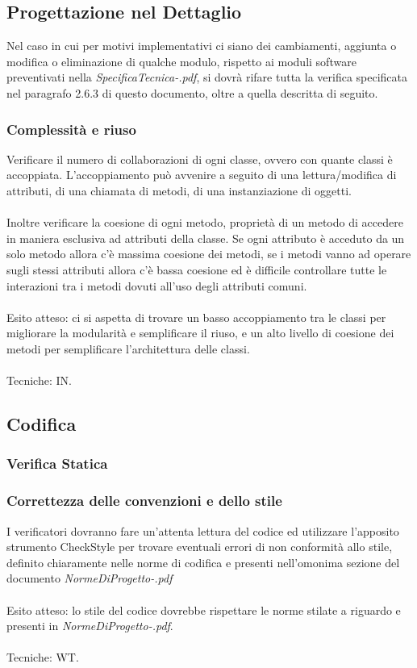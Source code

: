 \subsection{Progettazione nel Dettaglio}
Nel caso in cui per motivi implementativi ci siano dei
cambiamenti, aggiunta o modifica o eliminazione di qualche modulo, rispetto ai
moduli software preventivati nella \emph{SpecificaTecnica-\versioneST.pdf}, si
dovr\`a rifare tutta la verifica specificata nel paragrafo 2.6.3 di questo
documento, oltre a quella descritta di seguito. 
\subsubsection*{Complessit\`a e riuso}
Verificare il numero di collaborazioni di ogni classe, ovvero con quante classi
\`e accoppiata. L'accoppiamento pu\`o avvenire a seguito di una lettura/modifica
di attributi, di una chiamata di metodi, di una instanziazione di oggetti. \\ \\
Inoltre verificare la coesione di ogni metodo, propriet\`a di un metodo di
accedere in maniera esclusiva ad attributi della classe. Se ogni attributo \`e acceduto da
un solo metodo allora c'\`e massima coesione dei metodi, se i metodi vanno ad
operare sugli stessi attributi allora c'\`e bassa coesione ed \`e difficile
controllare tutte le interazioni tra i metodi dovuti all'uso degli attributi comuni.
\\ \\
Esito atteso: ci si aspetta di trovare un basso accoppiamento tra le classi per
migliorare la modularit\`a e semplificare il riuso, e un alto livello di
coesione dei metodi per semplificare l'architettura delle classi. \\ \\ 
Tecniche: IN.

\subsection{Codifica}

\subsubsection{Verifica Statica}

\subsubsection*{Correttezza delle convenzioni e dello stile}
I verificatori dovranno fare un'attenta lettura del codice ed utilizzare
l'apposito strumento CheckStyle per trovare eventuali errori di non
conformit\`a allo stile, definito chiaramente nelle norme di codifica e
presenti nell'omonima sezione del documento
\emph{NormeDiProgetto-\versionenormeprogetto.pdf}\\\\
Esito atteso: lo stile del codice dovrebbe rispettare le norme stilate a
riguardo e presenti in \emph{NormeDiProgetto-\versionenormeprogetto.pdf}.\\\\ 
Tecniche: WT.

